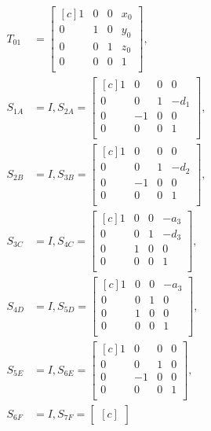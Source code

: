 \documentclass{article}
\begin{document}
\begin{align*}
T_{01} & =
\begin{bmatrix*}[c]
 1 & 0 & 0 & x_0 \\
 0 & 1 & 0 & y_0 \\
 0 & 0 & 1 & z_0 \\
 0 & 0 & 0 & 1 \\
\end{bmatrix*}, \\
S_{1A} &= I,
S_{2A} =
\begin{bmatrix*}[c]
1 & 0 & 0 & 0 \\
0 & 0 & 1 & -d_1 \\
0 & -1 & 0 & 0 \\
0 & 0 & 0 & 1 \\
\end{bmatrix*}, \\
S_{2B} &= I,
S_{3B} =
\begin{bmatrix*}[c]
1 & 0 & 0 & 0 \\
0 & 0 & 1 & -d_2 \\
0 & -1 & 0 & 0 \\
0 & 0 & 0 & 1 \\
\end{bmatrix*}, \\
S_{3C} &= I,
S_{4C} =
\begin{bmatrix*}[c]
1 & 0 & 0 & -a_3 \\
0 & 0 & 1 & -d_3 \\
0 & 1 & 0 & 0 \\
0 & 0 & 0 & 1 \\
\end{bmatrix*}, \\
S_{4D} &= I,
S_{5D} =
\begin{bmatrix*}[c]
1 & 0 & 0 & -a_3 \\
0 & 0 & 1 & 0 \\
0 & 1 & 0 & 0 \\
0 & 0 & 0 & 1 \\
\end{bmatrix*}, \\
S_{5E} &= I,
S_{6E} =
\begin{bmatrix*}[c]
1 & 0 & 0 & 0 \\
0 & 0 & 1 & 0 \\
0 & -1 & 0 & 0 \\
0 & 0 & 0 & 1 \\
\end{bmatrix*}, \\
S_{6F} &= I,
S_{7F} =
\begin{bmatrix*}[c]

\end{bmatrix*}
\end{align*}
\end{document}
